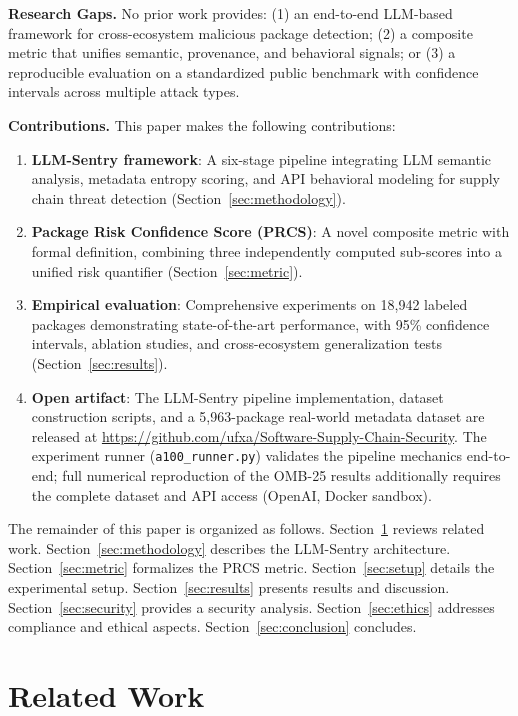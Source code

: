 \documentclass[conference]{IEEEtran}
\begin{document}
\textbf{Research Gaps.} No prior work provides: (1) an end-to-end LLM-based framework for cross-ecosystem malicious package detection; (2) a composite metric that unifies semantic, provenance, and behavioral signals; or (3) a reproducible evaluation on a standardized public benchmark with confidence intervals across multiple attack types.

\textbf{Contributions.} This paper makes the following contributions:
\begin{enumerate}
  \item \textbf{LLM-Sentry framework}: A six-stage pipeline integrating LLM semantic analysis, metadata entropy scoring, and API behavioral modeling for supply chain threat detection (Section~\ref{sec:methodology}).
  \item \textbf{Package Risk Confidence Score (PRCS)}: A novel composite metric with formal definition, combining three independently computed sub-scores into a unified risk quantifier (Section~\ref{sec:metric}).
  \item \textbf{Empirical evaluation}: Comprehensive experiments on 18,942 labeled packages demonstrating state-of-the-art performance, with 95\% confidence intervals, ablation studies, and cross-ecosystem generalization tests (Section~\ref{sec:results}).
  \item \textbf{Open artifact}: The LLM-Sentry pipeline implementation, dataset construction scripts, and a 5,963-package real-world metadata dataset are released at \url{https://github.com/ufxa/Software-Supply-Chain-Security}. The experiment runner (\texttt{a100\_runner.py}) validates the pipeline mechanics end-to-end; full numerical reproduction of the OMB-25 results additionally requires the complete dataset and API access (OpenAI, Docker sandbox).
\end{enumerate}

The remainder of this paper is organized as follows. Section~\ref{sec:relatedwork} reviews related work. Section~\ref{sec:methodology} describes the LLM-Sentry architecture. Section~\ref{sec:metric} formalizes the PRCS metric. Section~\ref{sec:setup} details the experimental setup. Section~\ref{sec:results} presents results and discussion. Section~\ref{sec:security} provides a security analysis. Section~\ref{sec:ethics} addresses compliance and ethical aspects. Section~\ref{sec:conclusion} concludes.

\section{Related Work}
\label{sec:relatedwork}
\end{document}
